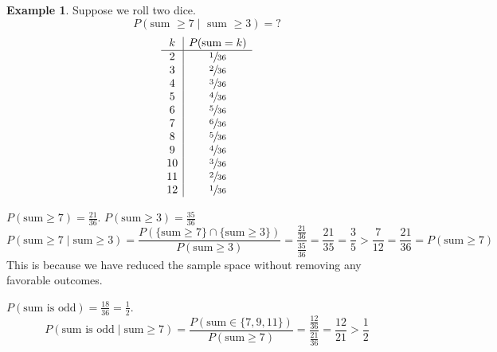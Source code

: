 \documentclass{article}
\theoremstyle{definition}
\newtheorem*{example}{Example}
\begin{document}
\begin{example}
Suppose we roll two dice.
$$P(\text{sum $\geq 7\mid$ sum $\geq 3$}) = ?$$
    $$\begin{array}{c|c}
        k & P(\text{sum} = k) \\ \hline
        2 & \sfrac{1}{36} \\
        3 & \sfrac{2}{36} \\
        4 & \sfrac{3}{36} \\
        5 & \sfrac{4}{36} \\
        6 & \sfrac{5}{36} \\
        7 & \sfrac{6}{36} \\
        8 & \sfrac{5}{36} \\
        9 & \sfrac{4}{36} \\
        10 & \sfrac{3}{36} \\
        11 & \sfrac{2}{36} \\
        12 & \sfrac{1}{36}
    \end{array}$$
\end{example}

$P(\text{sum}\geq7) = \frac{21}{36}$. $P(\text{sum}\geq3) = \frac{35}{36}$
$$P(\text{sum}\geq7\mid\text{sum}\geq3) = \frac{P(\{\text{sum}\geq7\}\cap\{\text{sum}\geq3\})}{P(\text{sum}\geq3)} = \frac{\frac{21}{36}}{\frac{35}{36}} = \frac{21}{35} = \frac{3}{5} > \frac{7}{12} = \frac{21}{36} = P(\text{sum}\geq7)$$
This is because we have reduced the sample space without removing any favorable outcomes. 

$P(\text{sum is odd}) = \frac{18}{36} = \frac{1}{2}$. 
$$P(\text{sum is odd}\mid\text{sum}\geq7) = \frac{P(\text{sum}\in\{7,9,11\})}{P(\text{sum}\geq7)} = \frac{\frac{12}{36}}{\frac{21}{36}} = \frac{12}{21} > \frac{1}{2}$$
\end{document}
